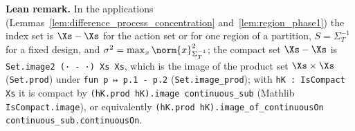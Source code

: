 \textbf{Lean remark.} In the applications (Lemmas~\ref{lem:difference_process_concentration}
and~\ref{lem:region_phase1}) the index set is $\Xs - \Xs$ for the action set or for one region
of a partition, $S = \Sigma_T^{-1}$ for a fixed design, and $\sigma^2 = \max_{x}\norm{x}^2_{\Sigma_T^{-1}}$;
the compact set $\Xs - \Xs$ is \texttt{Set.image2 (· - ·) Xs Xs}, which is the image of the
product set $\Xs\times\Xs$ (\texttt{Set.prod}) under \texttt{fun p ↦ p.1 - p.2}
(\texttt{Set.image\_prod}); with \texttt{hK : IsCompact Xs} it is compact by
\texttt{(hK.prod hK).image continuous\_sub} (Mathlib \texttt{IsCompact.image}), or equivalently
\texttt{(hK.prod hK).image\_of\_continuousOn continuous\_sub.continuousOn}.
